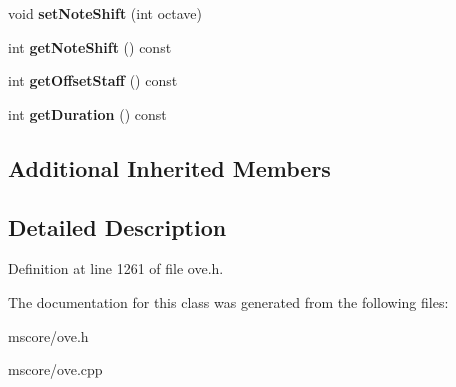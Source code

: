 \begin{DoxyCompactItemize}
void {\bfseries set\+Note\+Shift} (int octave)
\item 
\mbox{\label{class_o_v_e_1_1_note_container_ade8a9c71e754c08505329db34944b7cf}} 
int {\bfseries get\+Note\+Shift} () const
\item 
\mbox{\label{class_o_v_e_1_1_note_container_abdded33ddf96dbb4b846097e09ca8644}} 
int {\bfseries get\+Offset\+Staff} () const
\item 
\mbox{\label{class_o_v_e_1_1_note_container_a54063ce1da1f2599e908a4d2b56baef9}} 
int {\bfseries get\+Duration} () const
\end{DoxyCompactItemize}
\subsection*{Additional Inherited Members}


\subsection{Detailed Description}


Definition at line 1261 of file ove.\+h.



The documentation for this class was generated from the following files\+:\begin{DoxyCompactItemize}
\item 
mscore/ove.\+h\item 
mscore/ove.\+cpp\end{DoxyCompactItemize}
